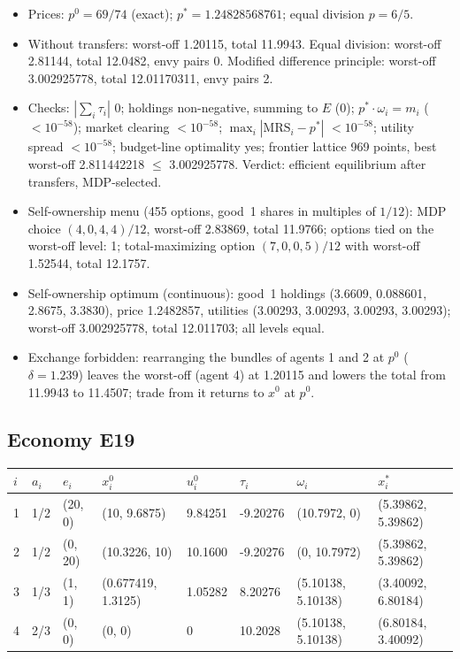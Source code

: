 \begin{itemize}[leftmargin=1.2em,itemsep=0pt,topsep=2pt]\footnotesize
\item Prices: $p^0 = 69/74$ (exact); $p^* = 1.24828568761$; equal division $p = 6/5$.
\item Without transfers: worst-off 1.20115, total 11.9943. Equal division: worst-off 2.81144, total 12.0482, envy pairs 0. Modified difference principle: worst-off 3.002925778, total 12.01170311, envy pairs 2.
\item Checks: $|\sum_i\tau_i|$ 0; holdings non-negative, summing to $E$ (0); $p^*\cdot\omega_i = m_i$ ($<10^{-58}$); market clearing $<10^{-58}$; $\max_i|\mathrm{MRS}_i - p^*|$ $<10^{-58}$; utility spread $<10^{-58}$; budget-line optimality yes; frontier lattice 969 points, best worst-off 2.811442218 $\leq$ 3.002925778. Verdict: efficient equilibrium after transfers, MDP-selected.
\item Self-ownership menu (455 options, good~1 shares in multiples of $1/12$): MDP choice $(4, 0, 4, 4)/12$, worst-off 2.83869, total 11.9766; options tied on the worst-off level: 1; total-maximizing option $(7, 0, 0, 5)/12$ with worst-off 1.52544, total 12.1757.
\item Self-ownership optimum (continuous): good~1 holdings (3.6609, 0.088601, 2.8675, 3.3830), price 1.2482857, utilities (3.00293, 3.00293, 3.00293, 3.00293); worst-off 3.002925778, total 12.011703; all levels equal.
\item Exchange forbidden: rearranging the bundles of agents 1 and 2 at $p^0$ ($\delta = 1.239$) leaves the worst-off (agent 4) at 1.20115 and lowers the total from 11.9943 to 11.4507; trade from it returns to $x^0$ at $p^0$.
\end{itemize}

\subsection*{Economy E19}
\label{ec:E19}
{\scriptsize\setlength{\tabcolsep}{3pt}
\begin{tabular}{@{}llllllll@{}}
\toprule
$i$ & $a_i$ & $e_i$ & $x^0_i$ & $u^0_i$ & $\tau_i$ & $\omega_i$ & $x^*_i$ \\
\midrule
1 & 1/2 & (20, 0) & (10, 9.6875) & 9.84251 & -9.20276 & (10.7972, 0) & (5.39862, 5.39862) \\
2 & 1/2 & (0, 20) & (10.3226, 10) & 10.1600 & -9.20276 & (0, 10.7972) & (5.39862, 5.39862) \\
3 & 1/3 & (1, 1) & (0.677419, 1.3125) & 1.05282 & 8.20276 & (5.10138, 5.10138) & (3.40092, 6.80184) \\
4 & 2/3 & (0, 0) & (0, 0) & 0 & 10.2028 & (5.10138, 5.10138) & (6.80184, 3.40092) \\
\bottomrule\end{tabular}}

